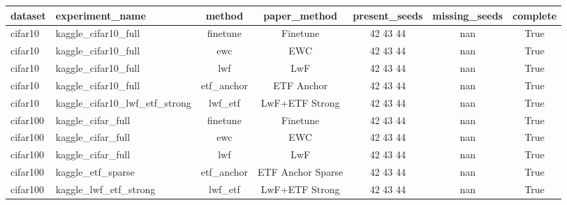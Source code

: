 \begin{tabular}{llccccc}
\hline
dataset & experiment\_name & method & paper\_method & present\_seeds & missing\_seeds & complete \\
\hline
cifar10 & kaggle\_cifar10\_full & finetune & Finetune & 42 43 44 & nan & True \\
cifar10 & kaggle\_cifar10\_full & ewc & EWC & 42 43 44 & nan & True \\
cifar10 & kaggle\_cifar10\_full & lwf & LwF & 42 43 44 & nan & True \\
cifar10 & kaggle\_cifar10\_full & etf\_anchor & ETF Anchor & 42 43 44 & nan & True \\
cifar10 & kaggle\_cifar10\_lwf\_etf\_strong & lwf\_etf & LwF+ETF Strong & 42 43 44 & nan & True \\
cifar100 & kaggle\_cifar\_full & finetune & Finetune & 42 43 44 & nan & True \\
cifar100 & kaggle\_cifar\_full & ewc & EWC & 42 43 44 & nan & True \\
cifar100 & kaggle\_cifar\_full & lwf & LwF & 42 43 44 & nan & True \\
cifar100 & kaggle\_etf\_sparse & etf\_anchor & ETF Anchor Sparse & 42 43 44 & nan & True \\
cifar100 & kaggle\_lwf\_etf\_strong & lwf\_etf & LwF+ETF Strong & 42 43 44 & nan & True \\
\hline
\end{tabular}
